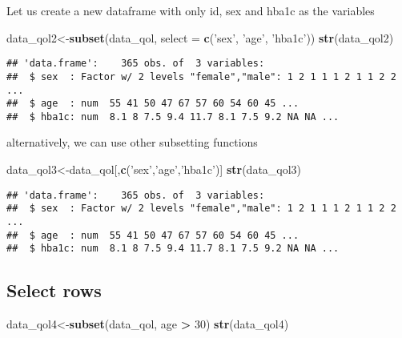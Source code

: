 \documentclass[]{book}
\newenvironment{Shaded}{\begin{snugshade}}{\end{snugshade}}
\newcommand{\KeywordTok}[1]{\textcolor[rgb]{0.13,0.29,0.53}{\textbf{#1}}}
\newcommand{\DataTypeTok}[1]{\textcolor[rgb]{0.13,0.29,0.53}{#1}}
\newcommand{\DecValTok}[1]{\textcolor[rgb]{0.00,0.00,0.81}{#1}}
\newcommand{\StringTok}[1]{\textcolor[rgb]{0.31,0.60,0.02}{#1}}
\newcommand{\OperatorTok}[1]{\textcolor[rgb]{0.81,0.36,0.00}{\textbf{#1}}}
\newcommand{\NormalTok}[1]{#1}
\theoremstyle{definition}
\theoremstyle{definition}
\theoremstyle{remark}
\begin{document}
Let us create a new dataframe with only id, sex and hba1c as the
variables

\begin{Shaded}
\begin{Highlighting}[]
\NormalTok{data_qol2<-}\KeywordTok{subset}\NormalTok{(data_qol, }\DataTypeTok{select =} \KeywordTok{c}\NormalTok{(}\StringTok{'sex'}\NormalTok{, }\StringTok{'age'}\NormalTok{, }\StringTok{'hba1c'}\NormalTok{))}
\KeywordTok{str}\NormalTok{(data_qol2)}
\end{Highlighting}
\end{Shaded}

\begin{verbatim}
## 'data.frame':    365 obs. of  3 variables:
##  $ sex  : Factor w/ 2 levels "female","male": 1 2 1 1 1 2 1 1 2 2 ...
##  $ age  : num  55 41 50 47 67 57 60 54 60 45 ...
##  $ hba1c: num  8.1 8 7.5 9.4 11.7 8.1 7.5 9.2 NA NA ...
\end{verbatim}

alternatively, we can use other subsetting functions

\begin{Shaded}
\begin{Highlighting}[]
\NormalTok{data_qol3<-data_qol[,}\KeywordTok{c}\NormalTok{(}\StringTok{'sex'}\NormalTok{,}\StringTok{'age'}\NormalTok{,}\StringTok{'hba1c'}\NormalTok{)]}
\KeywordTok{str}\NormalTok{(data_qol3)}
\end{Highlighting}
\end{Shaded}

\begin{verbatim}
## 'data.frame':    365 obs. of  3 variables:
##  $ sex  : Factor w/ 2 levels "female","male": 1 2 1 1 1 2 1 1 2 2 ...
##  $ age  : num  55 41 50 47 67 57 60 54 60 45 ...
##  $ hba1c: num  8.1 8 7.5 9.4 11.7 8.1 7.5 9.2 NA NA ...
\end{verbatim}

\subsection{Select rows}\label{select-rows}

\begin{Shaded}
\begin{Highlighting}[]
\NormalTok{data_qol4<-}\KeywordTok{subset}\NormalTok{(data_qol, age }\OperatorTok{>}\StringTok{ }\DecValTok{30}\NormalTok{)}
\KeywordTok{str}\NormalTok{(data_qol4)}
\end{Highlighting}
\end{Shaded}
\end{document}
